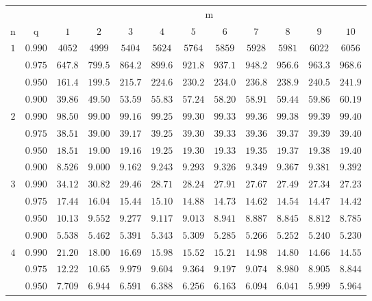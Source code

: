 \documentclass[11pt]{article}
\theoremstyle{definition}
\begin{document}
\begin{table}[H]
	\begin{tabularx}{\linewidth}{c | c | c c c c c c c c c c}
		& & \multicolumn{10}{c}{m}\\
		\cline{3-12}
		n & q & $1$ & $2$ & $3$ & $4$ & $5$ & $6$ & $7$ & $8$ & $9$ & $10$\\
		\hline
		$1$ & $0.990$ & $4052$ & $4999$ & $5404$ & $5624$ & $5764$ & $5859$ & $5928$ & $5981$ & $6022$ & $6056$ \\
		& $0.975$ & $647.8$ & $799.5$ & $864.2$ & $899.6$ & $921.8$ & $937.1$ & $948.2$ & $956.6$ & $963.3$ & $968.6$ \\
		& $0.950$ & $161.4$ & $199.5$ & $215.7$ & $224.6$ & $230.2$ & $234.0$ & $236.8$ & $238.9$ & $240.5$ & $241.9$ \\
		& $0.900$ & $39.86$ & $49.50$ & $53.59$ & $55.83$ & $57.24$ & $58.20$ & $58.91$ & $59.44$ & $59.86$ & $60.19$ \\
		$2$ & $0.990$ & $98.50$ & $99.00$ & $99.16$ & $99.25$ & $99.30$ & $99.33$ & $99.36$ & $99.38$ & $99.39$ & $99.40$ \\
		& $0.975$ & $38.51$ & $39.00$ & $39.17$ & $39.25$ & $39.30$ & $39.33$ & $39.36$ & $39.37$ & $39.39$ & $39.40$ \\
		& $0.950$ & $18.51$ & $19.00$ & $19.16$ & $19.25$ & $19.30$ & $19.33$ & $19.35$ & $19.37$ & $19.38$ & $19.40$ \\
		& $0.900$ & $8.526$ & $9.000$ & $9.162$ & $9.243$ & $9.293$ & $9.326$ & $9.349$ & $9.367$ & $9.381$ & $9.392$ \\
		$3$ & $0.990$ & $34.12$ & $30.82$ & $29.46$ & $28.71$ & $28.24$ & $27.91$ & $27.67$ & $27.49$ & $27.34$ & $27.23$ \\
		& $0.975$ & $17.44$ & $16.04$ & $15.44$ & $15.10$ & $14.88$ & $14.73$ & $14.62$ & $14.54$ & $14.47$ & $14.42$ \\
		& $0.950$ & $10.13$ & $9.552$ & $9.277$ & $9.117$ & $9.013$ & $8.941$ & $8.887$ & $8.845$ & $8.812$ & $8.785$ \\
		& $0.900$ & $5.538$ & $5.462$ & $5.391$ & $5.343$ & $5.309$ & $5.285$ & $5.266$ & $5.252$ & $5.240$ & $5.230$ \\
		$4$ & $0.990$ & $21.20$ & $18.00$ & $16.69$ & $15.98$ & $15.52$ & $15.21$ & $14.98$ & $14.80$ & $14.66$ & $14.55$ \\
		& $0.975$ & $12.22$ & $10.65$ & $9.979$ & $9.604$ & $9.364$ & $9.197$ & $9.074$ & $8.980$ & $8.905$ & $8.844$ \\
		& $0.950$ & $7.709$ & $6.944$ & $6.591$ & $6.388$ & $6.256$ & $6.163$ & $6.094$ & $6.041$ & $5.999$ & $5.964$ \\

\end{tabularx}
\end{table}
\end{document}
